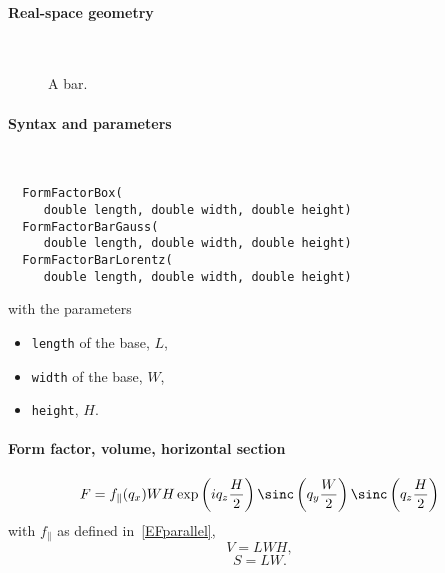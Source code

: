\paragraph{Real-space geometry}\strut\\

\begin{figure}[H]
\hfill
{}
\hfill
{}
\hfill
{}
\hfill
\caption{A bar.}
\end{figure}

\FloatBarrier

\paragraph{Syntax and parameters}\strut\\[-2ex plus .2ex minus .2ex]
\begin{lstlisting}
  FormFactorBox(
     double length, double width, double height)
  FormFactorBarGauss(
     double length, double width, double height)
  FormFactorBarLorentz(
     double length, double width, double height)
\end{lstlisting}
with the parameters
\begin{itemize}
\item \texttt{length} of the base, $L$,
\item \texttt{width} of the base, $W$,
\item \texttt{height}, $H$.
\end{itemize}

\paragraph{Form factor, volume, horizontal section}

\begin{equation*}
F= f_\parallel(q_x) W H\exp\left(i q_z \frac{H}{2}\right)
\sinc\left(q_y \frac{W}{2}\right) \sinc\left(q_z \frac{H}{2}\right)
\end{equation*}
with $f_\parallel$ as defined in~\cref{EFparallel},
\begin{equation*}
  V= LWH,
\end{equation*}
\begin{equation*}
  S = LW.
\end{equation*}

 \label{SRipple1}


